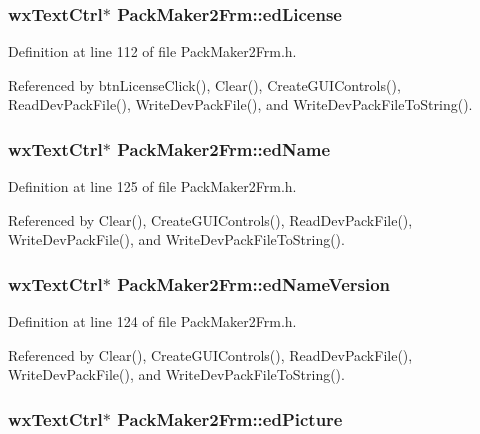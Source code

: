 \subsubsection{\setlength{\rightskip}{0pt plus 5cm}wx\-Text\-Ctrl$\ast$ {\bf Pack\-Maker2Frm::ed\-License}\hspace{0.3cm}{\tt  [private]}}\label{class_pack_maker2_frm_c36972903ad86dd4a7938ac1fbd4cd92}




Definition at line 112 of file Pack\-Maker2Frm.h.

Referenced by btn\-License\-Click(), Clear(), Create\-GUIControls(), Read\-Dev\-Pack\-File(), Write\-Dev\-Pack\-File(), and Write\-Dev\-Pack\-File\-To\-String().
\subsubsection{\setlength{\rightskip}{0pt plus 5cm}wx\-Text\-Ctrl$\ast$ {\bf Pack\-Maker2Frm::ed\-Name}\hspace{0.3cm}{\tt  [private]}}\label{class_pack_maker2_frm_59c8f7433df9c8efffb2221c879bfefc}




Definition at line 125 of file Pack\-Maker2Frm.h.

Referenced by Clear(), Create\-GUIControls(), Read\-Dev\-Pack\-File(), Write\-Dev\-Pack\-File(), and Write\-Dev\-Pack\-File\-To\-String().
\subsubsection{\setlength{\rightskip}{0pt plus 5cm}wx\-Text\-Ctrl$\ast$ {\bf Pack\-Maker2Frm::ed\-Name\-Version}\hspace{0.3cm}{\tt  [private]}}\label{class_pack_maker2_frm_9f14b68f526bdc333159e98b79268410}




Definition at line 124 of file Pack\-Maker2Frm.h.

Referenced by Clear(), Create\-GUIControls(), Read\-Dev\-Pack\-File(), Write\-Dev\-Pack\-File(), and Write\-Dev\-Pack\-File\-To\-String().
\subsubsection{\setlength{\rightskip}{0pt plus 5cm}wx\-Text\-Ctrl$\ast$ {\bf Pack\-Maker2Frm::ed\-Picture}\hspace{0.3cm}{\tt  [private]}}\label{class_pack_maker2_frm_26f20ffc5fcae11fd3ba6041fc22bc6b}




